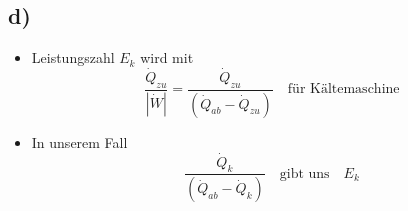 

\subsection*{d)}
\begin{itemize}
    \item Leistungszahl $E_k$ wird mit 
    \[
    \frac{\dot{Q}_{zu}}{|\dot{W}|} = \frac{\dot{Q}_{zu}}{(\dot{Q}_{ab} - \dot{Q}_{zu})} \quad \text{für Kältemaschine}
    \]
    \item In unserem Fall 
    \[
    \frac{\dot{Q}_k}{(\dot{Q}_{ab} - \dot{Q}_k)} \quad \text{gibt uns} \quad E_k
    \]
\end{itemize}